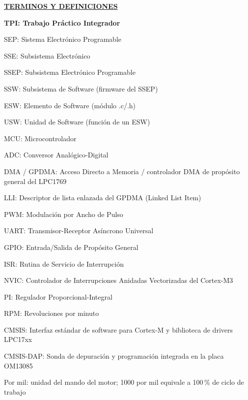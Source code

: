 \begin{center}
{\fuenteTitulos\fontsize{14}{17}\selectfont\bfseries\underline{TERMINOS Y DEFINICIONES}}
\end{center}
\vspace{6mm}
{\fontsize{12}{15}\selectfont\bfseries
TPI: Trabajo Práctico Integrador\par
SEP: Sistema Electrónico Programable\par
SSE: Subsistema Electrónico\par
SSEP: Subsistema Electrónico Programable\par
SSW: Subsistema de Software (firmware del SSEP)\par
ESW: Elemento de Software (módulo .c/.h)\par
USW: Unidad de Software (función de un ESW)\par
MCU: Microcontrolador\par
ADC: Conversor Analógico-Digital\par
DMA / GPDMA: Acceso Directo a Memoria / controlador DMA de propósito general del LPC1769\par
LLI: Descriptor de lista enlazada del GPDMA (Linked List Item)\par
PWM: Modulación por Ancho de Pulso\par
UART: Transmisor-Receptor Asíncrono Universal\par
GPIO: Entrada/Salida de Propósito General\par
ISR: Rutina de Servicio de Interrupción\par
NVIC: Controlador de Interrupciones Anidadas Vectorizadas del Cortex-M3\par
PI: Regulador Proporcional-Integral\par
RPM: Revoluciones por minuto\par
CMSIS: Interfaz estándar de software para Cortex-M y biblioteca de drivers LPC17xx\par
CMSIS-DAP: Sonda de depuración y programación integrada en la placa OM13085\par
Por mil: unidad del mando del motor; 1000 por mil equivale a 100\,\% de ciclo de trabajo\par}
